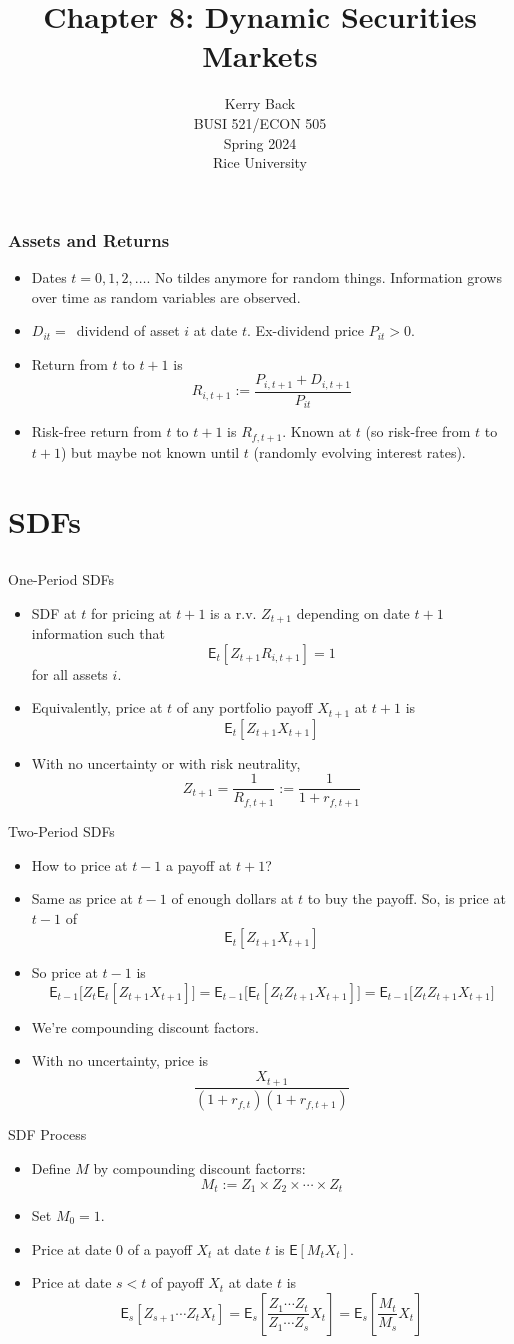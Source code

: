 \documentclass[10pt]{beamer}
\title{Chapter 8: Dynamic Securities Markets}
\date{}
\author{Kerry Back\\ 
BUSI 521/ECON 505\\
Spring 2024\\
Rice University}
\newcommand{\bi}{\begin{itemize}}
\newcommand{\ei}{\end{itemize}}
\newcommand{\im}{\item}
\newcommand{\mye}{\ensuremath{\mathsf{E}}}
\newcommand{\bfr}{\begin{frame}}
\begin{document}
\maketitle


\bfr\frametitle{Assets and Returns}
\bi \im Dates $t=0,1,2,\ldots$.  No tildes anymore for random things.  Information grows over time as random variables are observed.
 \im 
$D_{it}=\,$ dividend of asset $i$ at date $t$.
 Ex-dividend price $P_{it}>0$.  
 \im 
Return from $t$ to $t+1$ is
$$R_{i,t+1} := \frac{P_{i,t+1}+D_{i,t+1}}{P_{it}}$$

\im Risk-free return from $t$ to $t+1$ is $R_{f,t+1}$.  Known at $t$ (so risk-free from $t$ to $t+1$) but maybe not known until $t$ (randomly evolving interest rates).
\ei
\end{frame}

\section{SDFs}\subsection{}

\begin{frame}{One-Period SDFs}

\bi 
\im SDF at $t$ for pricing at $t+1$ is a r.v. $Z_{t+1}$ depending on date $t+1$ information such that
$$\mye_t[Z_{t+1}R_{i, t+1}] = 1$$
for all assets $i$.
\im Equivalently, price at $t$ of any portfolio payoff $X_{t+1}$ at $t+1$ is
$$\mye_t[Z_{t+1}X_{t+1}]$$
\im With no uncertainty or with risk neutrality,
$$Z_{t+1} = \frac{1}{R_{f, t+1}} := \frac{1}{1+r_{f, t+1}}$$
\ei
\end{frame}

\begin{frame}{Two-Period SDFs}
\bi 
\im How to price at $t-1$ a payoff at $t+1$?
\pause 
\im Same as price at $t-1$ of enough dollars at $t$ to buy the payoff.  So, is price at $t-1$ of 
$$\mye_t[Z_{t+1}X_{t+1}]$$
\pause 
\im So price at $t-1$ is
$$\mye_{t-1}\bigg[Z_t\mye_t[Z_{t+1}X_{t+1}]\bigg] = \mye_{t-1}\bigg[\mye_t[Z_tZ_{t+1}X_{t+1}]\bigg] = \mye_{t-1}\bigg[Z_tZ_{t+1}X_{t+1}\bigg]$$
\im We're compounding discount factors. 
\im With no uncertainty, price is 
$$\frac{X_{t+1}}{(1+r_{f,t})(1+r_{f,t+1})}$$
\ei
\end{frame}

\begin{frame}{SDF Process}
    \bi 
    \im Define $M$ by compounding discount factorrs:
    $$M_{t} := Z_1 \times Z_2 \times \cdots \times Z_{t}$$
    \im Set $M_0=1$.
    \im Price at date 0 of a payoff $X_t$ at date $t$ is $\mye[M_tX_t]$.
    \pause 
    \im Price at date $s<t$ of payoff $X_t$ at date $t$ is
    $$\mye_s[Z_{s+1}\cdots Z_tX_t] = \mye_s \left[\frac{Z_1 \cdots Z_t}{Z_1\cdots Z_s}X_t\right] = \mye_s \left[\frac{M_t}{M_s}X_t\right]$$
    \ei
\end{frame}
\end{document}
